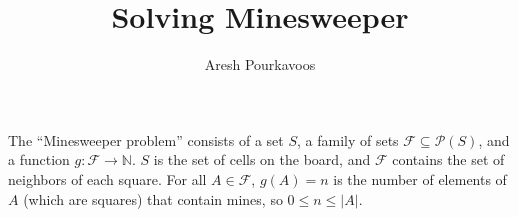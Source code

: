 \documentclass{article}
\begin{document}
\title{Solving Minesweeper}
\author{Aresh Pourkavoos}
\maketitle

The ``Minesweeper problem'' consists of a set $S$,
a family of sets $\mathcal{F} \subseteq \mathcal{P}(S)$,
and a function $g : \mathcal{F} \rightarrow \mathbb{N}$.
$S$ is the set of cells on the board,
and $\mathcal{F}$ contains the set of neighbors of each square.
For all $A \in \mathcal{F}$, $g(A)=n$ is the number of elements of $A$
(which are squares) that contain mines,
so $0 \leq n \leq \vert A \vert$.
\end{document}

